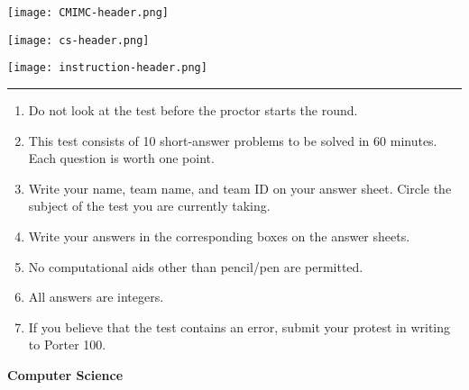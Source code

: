 \documentclass[10pt]{article}
\begin{document}
\thispagestyle{empty}
\begin{center}

\vspace*{90pt}

\texttt{[image: CMIMC-header.png]}

\texttt{[image: cs-header.png]}

\vspace{1.6in}

\texttt{[image: instruction-header.png]}
\noindent\rule{17.7cm}{2pt}
\end{center}

\vspace{10pt}

\begin{enumerate}
\large
\item Do not look at the test before the proctor starts the round.

\item This test consists of 10 short-answer problems to be solved in 60 minutes.
	Each question is worth one point.

\item Write your name, team name, and team ID on your answer sheet. Circle the
	subject of the test you are currently taking.

\item Write your answers in the corresponding boxes on the answer sheets.

\item No computational aids other than pencil/pen are permitted.

\item All answers are integers.

\item If you believe that the test contains an error, submit your protest in writing to Porter 100.
\end{enumerate}

\newpage

\begin{center}
\huge\textbf{Computer Science}\normalsize

\vspace{3pt}
\end{center}
\end{document}
